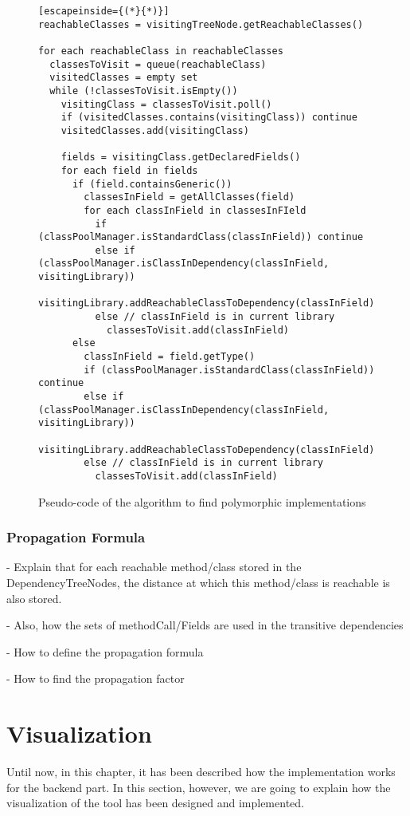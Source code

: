 \begin{figure}[ht!]
\begin{lstlisting}[escapeinside={(*}{*)}]
reachableClasses = visitingTreeNode.getReachableClasses()

for each reachableClass in reachableClasses
  classesToVisit = queue(reachableClass)
  visitedClasses = empty set
  while (!classesToVisit.isEmpty())
    visitingClass = classesToVisit.poll()
    if (visitedClasses.contains(visitingClass)) continue
    visitedClasses.add(visitingClass)

    fields = visitingClass.getDeclaredFields()
    for each field in fields
      if (field.containsGeneric())
        classesInField = getAllClasses(field)
        for each classInField in classesInFIeld
          if (classPoolManager.isStandardClass(classInField)) continue
          else if (classPoolManager.isClassInDependency(classInField, visitingLibrary))
            visitingLibrary.addReachableClassToDependency(classInField)
          else // classInField is in current library
            classesToVisit.add(classInField)
      else
        classInField = field.getType()
        if (classPoolManager.isStandardClass(classInField)) continue
        else if (classPoolManager.isClassInDependency(classInField, visitingLibrary))
          visitingLibrary.addReachableClassToDependency(classInField)
        else // classInField is in current library
          classesToVisit.add(classInField)
\end{lstlisting}
\caption{Pseudo-code of the algorithm to find polymorphic implementations}
\label{fig:calculate-tac}
\end{figure}

\subsubsection{Propagation Formula}
- Explain that for each reachable method/class stored in the DependencyTreeNodes, the distance at which this method/class is reachable is also stored.

- Also, how the sets of methodCall/Fields are used in the transitive dependencies

- How to define the propagation formula

- How to find the propagation factor

\section{Visualization}
Until now, in this chapter, it has been described how the implementation works for the backend part. In this section, however, we are going to explain how the visualization of the tool has been designed and implemented.

